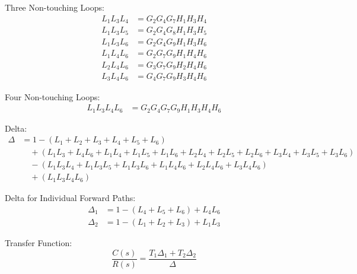 ﻿\documentclass[11pt]{article}
\begin{document}
\vspace{0.5em}

Three Non-touching Loops:
\begin{align*}
L_1 L_3 L_4 &= G_2 G_4 G_7 H_1 H_3 H_4 \\
L_1 L_3 L_5 &= G_2 G_4 G_8 H_1 H_3 H_5 \\
L_1 L_3 L_6 &= G_2 G_4 G_9 H_1 H_3 H_6 \\
L_1 L_4 L_6 &= G_2 G_7 G_9 H_1 H_4 H_6 \\
L_2 L_4 L_6 &= G_3 G_7 G_9 H_2 H_4 H_6 \\
L_3 L_4 L_6 &= G_4 G_7 G_9 H_3 H_4 H_6
\end{align*}

\vspace{0.5em}

Four Non-touching Loops:
\begin{align*}
L_1 L_3 L_4 L_6 &= G_2 G_4 G_7 G_9 H_1 H_3 H_4 H_6
\end{align*}

\vspace{0.5em}

Delta:
{\small
\begin{align*}
\Delta &= 1 - (L_1 + L_2 + L_3 + L_4 + L_5 + L_6) \\
&\quad + (L_1 L_3 + L_4 L_6 + L_1 L_4 + L_1 L_5 + L_1 L_6 + L_2 L_4 + L_2 L_5 + L_2 L_6 + L_3 L_4 + L_3 L_5 + L_3 L_6) \\
&\quad - (L_1 L_3 L_4 + L_1 L_3 L_5 + L_1 L_3 L_6 + L_1 L_4 L_6 + L_2 L_4 L_6 + L_3 L_4 L_6) \\
&\quad + (L_1 L_3 L_4 L_6)
\end{align*}
}

\vspace{0.5em}

Delta for Individual Forward Paths:
\begin{align*}
\Delta_1 &= 1 - (L_4 + L_5 + L_6) + L_4 L_6 \\
\Delta_2 &= 1 - (L_1 + L_2 + L_3) + L_1 L_3
\end{align*}

\vspace{0.5em}

Transfer Function:
\[
\frac{C(s)}{R(s)} = \frac{T_1 \Delta_1 + T_2 \Delta_2}{\Delta}
\]
\end{document}
